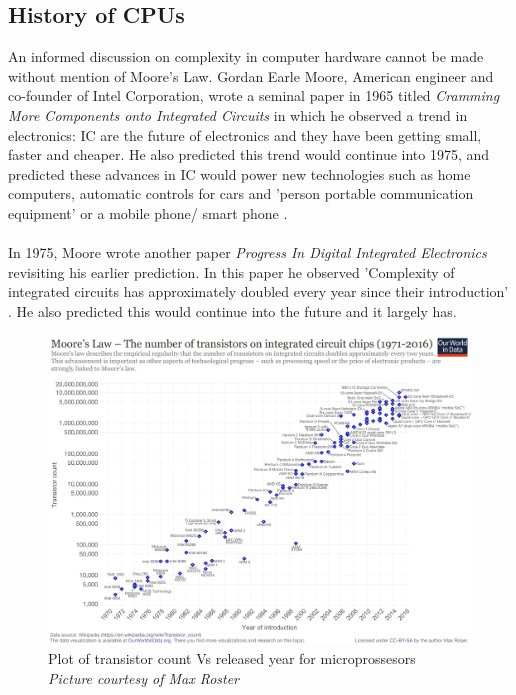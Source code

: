 \subsection{History of CPUs}
An informed discussion on complexity in computer hardware cannot be made without mention of Moore's Law.  Gordan Earle Moore, American engineer and co-founder of Intel Corporation, wrote a seminal paper in 1965 titled \textit{Cramming  More  Components  onto Integrated  Circuits} in which he observed a trend in electronics: IC are the future of electronics and they have been getting small, faster and cheaper. He also predicted this trend would continue into 1975, and predicted these advances in IC would power new technologies such as home computers, automatic controls for cars and 'person portable communication equipment' or a mobile phone/ smart phone \cite{moore65}. \\\\

In 1975, Moore wrote another paper \textit{Progress In Digital Integrated Electronics} revisiting his earlier prediction. In this paper he observed 'Complexity of integrated circuits has approximately doubled every year since their introduction' \cite{moore75}. He also predicted this would continue into the future and it largely has. 

\begin{figure} \begin{center}
\includegraphics[width=1\linewidth]{pics/moore_law} 
\end{center} 
\caption{Plot of transistor count Vs released year for microprossesors\\ \textit{\small{Picture courtesy of  Max Roster}}}
\end{figure}

